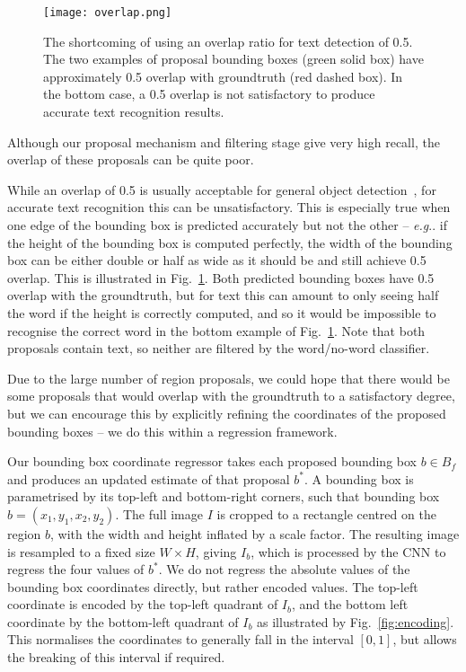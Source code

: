 \documentclass[twocolumn]{svjour3}          \smartqed  \usepackage{epsfig}
\makeatletter
\DeclareRobustCommand\onedot{\futurelet\@let@token\@onedot}
\def\@onedot{\ifx\@let@token.\else.\null\fi\xspace}
\def\eg{\emph{e.g}\onedot} \def\Eg{\emph{E.g}\onedot}
\makeatother
\begin{document}
\begin{figure}
\begin{center}
\texttt{[image: overlap.png]} 
\caption{The shortcoming of using an overlap ratio for text detection of 0.5. The two examples of proposal bounding boxes (green solid box) have approximately 0.5 overlap with groundtruth (red dashed box). In the bottom case, a 0.5 overlap is not satisfactory to produce accurate text recognition results.}
\label{fig:overlap}
\end{center}
\end{figure}

Although our proposal mechanism and filtering stage give very high recall, the overlap of these proposals can be quite poor. 

While an overlap of 0.5 is usually acceptable for general object detection~\cite{Everingham10}, for accurate text recognition this can be unsatisfactory. This is especially true when one edge of the bounding box is predicted accurately but not the other -- \eg if the height of the bounding box is computed perfectly, the width of the bounding box can be either double or half as wide as it should be and still achieve 0.5 overlap. This is illustrated in Fig.~\ref{fig:overlap}. Both predicted bounding boxes have 0.5 overlap with the groundtruth, but for text this can amount to only seeing half the word if the height is correctly computed, and so it would be impossible to recognise the correct word in the bottom example of Fig.~\ref{fig:overlap}. Note that both proposals contain text, so neither are filtered by the word/no-word classifier.

Due to the large number of region proposals, we could hope that there would be some proposals that would overlap with the groundtruth to a satisfactory degree, but we can encourage this by explicitly refining the coordinates of the proposed bounding boxes -- we do this within a regression framework. 

Our bounding box coordinate regressor takes each proposed bounding box $b \in B_f$ and produces an updated estimate of that proposal $b^*$. A bounding box is parametrised by its top-left and bottom-right corners, such that bounding box $b = (x_1,y_1,x_2,y_2)$. The full image $I$ is cropped to a rectangle centred on the region $b$, with the width and height inflated by a scale factor. The resulting image is resampled to a fixed size $W \times H$, giving $I_b$, which is processed by the CNN to regress the four values of $b^*$. We do not regress the absolute values of the bounding box coordinates directly, but rather encoded values. The top-left coordinate is encoded by the top-left quadrant of $I_b$, and the bottom left coordinate by the bottom-left quadrant of $I_b$ as illustrated by Fig.~\ref{fig:encoding}. This normalises the coordinates to generally fall in the interval $[0,1]$, but allows the breaking of this interval if required.
\end{document}

